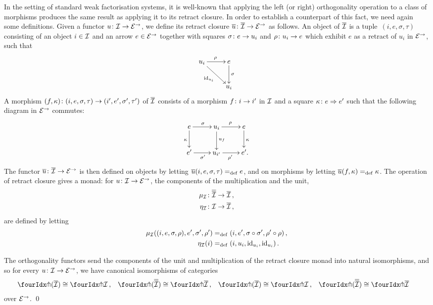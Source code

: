 \documentclass[reqno,10pt,a4paper,oneside,draft]{amsart}
\begin{document}
In the setting of standard weak factorisation systems, it is well-known that applying the left (or right) orthogonality operation to a class of morphisms produces the same result as applying it to its retract closure.
In order to establish a counterpart of this fact, we need again some definitions.
Given a functor $u \co \cal{I} \to \catE^\to$, we define its retract closure $\overline{u} \co \overline{\cal{I}} \to \catE^\to$ as follows.
An object of $\overline{\cal{I}}$ is a tuple~$(i, e, \sigma, \tau)$ consisting of an object $i \in \cal{I}$ and an arrow $e \in \cal{E}^\to$ together with squares $\sigma \co e \rightarrow u_i$ and $\rho \co u_i \rightarrow e$ which exhibit $e$ as a retract of $u_i$ in $\catE^\to$, \ie such that 
\[
\xymatrix{
u_i \ar[r]^\rho \ar[dr]_{\id_{u_i}} & e \ar[d]^{\sigma} \\
  & u_i }
  \]
A morphism $(f, \kappa) \co (i, e, \sigma, \tau) \to (i', e', \sigma', \tau')$ of $\overline{\cal{I}}$ consists of a morphism $f \co i \to i'$ in $\cal{I}$ and a square $\kappa \co e \Rightarrow e'$ such that the following diagram in $\cal{E}^\to$ commutes:
\[
\xymatrix{
  e
  \ar[r]^{\sigma}
  \ar[d]_{\kappa}
&
  u_i
  \ar[r]^{\rho}
  \ar[d]^{u_f}
&
  e
  \ar[d]^{\kappa}
\\
  e'
  \ar[r]_{\sigma'}
&
  u_{i'}
  \ar[r]_{\rho'}
&
  e'
\rlap{.}}
\]
The functor $\overline{u} \co \overline{\cal{I}} \to \catE^\to$ is then defined on objects by letting $\overline{u}(i, e, \sigma, \tau) \defeq e$, and on morphisms by letting $\overline{u}(f, \kappa) \defeq \kappa$.
The operation of retract closure gives a monad: for $u \co \cal{I} \to \catE^\to$, the components of the multiplication and the unit,
\begin{align*}
  \mu_\cal{I} &\co \overline{\overline{\cal{I}}} \to \overline{\cal{I}}
\, ,\\
  \eta_\cal{I} &\co \cal{I} \to \overline{\cal{I}}
\, ,
\end{align*}
are defined by letting
\begin{align*}
  \mu_\cal{I}((i, e, \sigma, \rho), e', \sigma', \rho') &\defeq (i, e', \sigma \cc \sigma', \rho' \cc \rho)
\, ,\\
  \eta_\cal{I}(i) &\defeq (i, u_i, \id_{u_i}, \id_{u_i})
\, .
\end{align*}

\begin{proposition} \label{retract-closure}
The orthogonality functors send the components of the unit and multiplication of the retract closure monad into natural isomorphisms, and so for every $u \co \cal{I} \to \catE^\to$, we have canonical isomorphisms of categories
\begin{align*}
  \liftr{(\overline{\cal{I}})} &\iso \liftr{\cal{I}}
\, ,&
  \liftr{(\overline{\overline{\cal{I}}})} &\iso \liftr{\overline{\cal{I}}}
\, ,&
  \liftl{(\overline{\cal{I}})} &\iso \liftl{\cal{I}}
\, ,&
 \liftl{(\overline{\overline{\cal{I}}})} &\iso \liftl{\overline{\cal{I}}}
\end{align*}
over $\catE^\to$.
\qed
\end{proposition}
\end{document}
